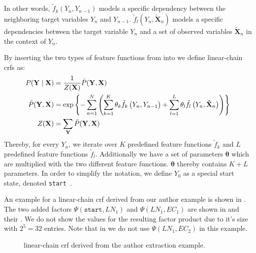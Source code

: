 In other words, $\tilde{f}_k(Y_n,Y_{n-1})$ models a specific dependency between the neighboring \glspl{target variable} $Y_n$ and $Y_{n-1}$. $\tilde{f}_l(Y_n,\mathbf{\tilde{X}}_n)$ models a specific dependencies between the \gls{target variable} $Y_n$ and a set of \glspl{observed variable} $\mathbf{\tilde{X}}_n$ in the context of $Y_n$.

By inserting the two types of \glspl{feature function} from  into  we define \glspl{linear-chain crf} as:
\begin{equation}
  \label{equ:linear-chain-crf-log-linear}
  \begin{split}
    P(\mathbf{Y}\mid\mathbf{X}) & = \frac{1}{Z(\mathbf{X})}\tilde{P}(\mathbf{Y},\mathbf{X})  \\
    \tilde{P}(\mathbf{Y},\mathbf{X}) & = \exp\left\{ -\sum_{n=1}^N \left(\sum_{k=1}^K\theta_k \tilde{f}_k\left(\vphantom{\tilde{X}}Y_n,Y_{n-1}\right)+\sum_{l=1}^L\theta_l \tilde{f}_l\left(Y_n,\mathbf{\tilde{X}}_n\right)\right) \right\} \\
    Z(\mathbf{X}) & = \sum_{\mathbf{Y}}\tilde{P}(\mathbf{Y},\mathbf{X})
  \end{split}
\end{equation}
Thereby, for every $Y_n$, we iterate over $K$ predefined \glspl{feature function} $\tilde{f}_k$ and $L$ predefined \glspl{feature function} $\tilde{f}_l$.
Additionally we have a set of parameters $\bm{\theta}$ which are multiplied with the two different feature functions.
$\bm{\theta}$ thereby contains $K+L$ parameters.
In order to simplify the notation, we define $Y_0$ as a special start state, denoted \texttt{start}~\citep{lafferty2001conditional}.

An example for a  \gls{linear-chain crf} derived from our author example is shown in .
The two added \glspl{factor} $\Psi(\texttt{start},LN_1)$ and $\Psi(LN_1,EC_1)$ are shown in  and their .
We do not show the values for the resulting \gls{factor product} due to it's size with $2^5{=}32$ entries.
Note that in  we do not use $\Psi(LN_1,EC_2)$ in this example.

\begin{figure}[t]
\centering

\caption[]{%
  \Gls{linear-chain crf} derived from the author extraction example.
}
\label{fig:example-linear-chain-crf}
\end{figure}

